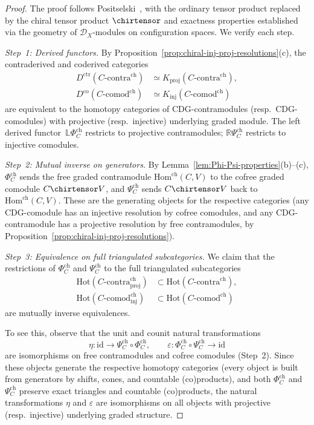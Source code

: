 \begin{proof}
The proof follows Positselski~\cite[\S5.2]{Positselski11}, with the
ordinary tensor product replaced by the chiral tensor product
$\chirtensor$ and exactness properties established via the geometry
of $\mathcal{D}_X$-modules on configuration spaces. We verify
each step.

\emph{Step~1: Derived functors.}
By Proposition~\ref{prop:chiral-inj-proj-resolutions}(c),
the contraderived and coderived categories
\begin{align*}
D^{\mathrm{ctr}}(C\text{-}\mathrm{contra}^{\mathrm{ch}})
&\simeq K_{\mathrm{proj}}(C\text{-}\mathrm{contra}^{\mathrm{ch}}),\\
D^{\mathrm{co}}(C\text{-}\mathrm{comod}^{\mathrm{ch}})
&\simeq K_{\mathrm{inj}}(C\text{-}\mathrm{comod}^{\mathrm{ch}})
\end{align*}
are equivalent to the homotopy categories of
CDG-contra\-modules (resp.\ CDG-comodules) with
projective (resp.\ injective) underlying graded module.
The left derived functor~$\mathbb{L}\Phi_C^{\mathrm{ch}}$
restricts to projective contramodules;
$\mathbb{R}\Psi_C^{\mathrm{ch}}$ restricts to injective comodules.

\emph{Step~2: Mutual inverse on generators.}
By Lemma~\ref{lem:Phi-Psi-properties}(b)--(c), $\Phi_C^{\mathrm{ch}}$
sends the free graded contramodule $\mathrm{Hom}^{\mathrm{ch}}(C, V)$
to the cofree graded comodule $C \chirtensor V$, and
$\Psi_C^{\mathrm{ch}}$ sends $C \chirtensor V$ back to
$\mathrm{Hom}^{\mathrm{ch}}(C, V)$. These are the generating objects
for the respective categories (any CDG-comodule has an injective
resolution by cofree comodules, and any CDG-contramodule has a
projective resolution by free contramodules, by
Proposition~\ref{prop:chiral-inj-proj-resolutions}).

\emph{Step~3: Equivalence on full triangulated subcategories.}
We claim that the restrictions of $\Phi_C^{\mathrm{ch}}$ and
$\Psi_C^{\mathrm{ch}}$ to the full triangulated subcategories
\begin{align*}
\mathrm{Hot}(C\text{-}\mathrm{contra}^{\mathrm{ch}}_{\mathrm{proj}})
&\subset \mathrm{Hot}(C\text{-}\mathrm{contra}^{\mathrm{ch}}), \\
\mathrm{Hot}(C\text{-}\mathrm{comod}^{\mathrm{ch}}_{\mathrm{inj}})
&\subset \mathrm{Hot}(C\text{-}\mathrm{comod}^{\mathrm{ch}})
\end{align*}
are mutually inverse equivalences.

To see this, observe that the unit and counit natural transformations
\[
\eta\colon \mathrm{id} \to \Psi_C^{\mathrm{ch}} \circ \Phi_C^{\mathrm{ch}},
\qquad
\varepsilon\colon \Phi_C^{\mathrm{ch}} \circ \Psi_C^{\mathrm{ch}} \to \mathrm{id}
\]
are isomorphisms on free contramodules and cofree comodules
(Step~2). Since these objects generate the respective
homotopy categories (every object is built from generators by
shifts, cones, and countable (co)products),
and both $\Phi_C^{\mathrm{ch}}$ and $\Psi_C^{\mathrm{ch}}$ preserve
exact triangles and countable (co)products, the natural
transformations $\eta$ and $\varepsilon$ are isomorphisms
on all objects with projective (resp.\ injective) underlying graded
structure.


\end{proof}
